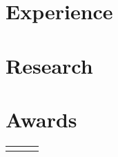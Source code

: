\documentclass[]{deedy-resume-openfont}
\begin{document}
\hfill
\begin{minipage}[t]{0.66\textwidth} 


\section{Experience}
\runsubsection{  }
\descript{|  }
\location{  |  }
\begin{tightemize}
\end{tightemize}
\sectionsep


\section{Research}
\runsubsection{  }
\descript{|  }
\location{  |  }

\sectionsep


\section{Awards} 
\begin{tabular}{rll}
 &  &  \\
\end{tabular}
\sectionsep

\end{minipage} 
\end{document}
